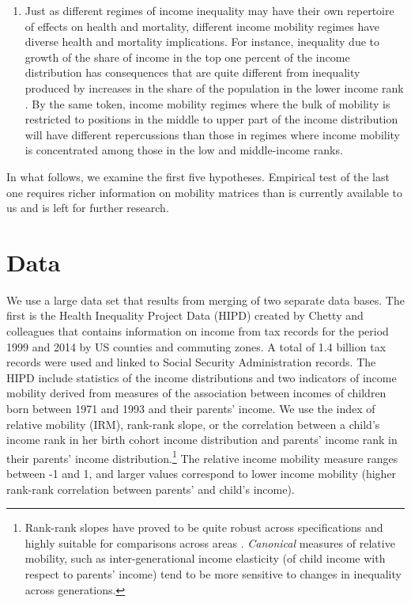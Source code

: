 \documentclass[11pt]{article}
\begin{document}
\begin{enumerate}
    \item Just as different regimes of income inequality may have their own repertoire of effects on health and mortality, different income mobility regimes have diverse health and mortality implications. For instance, inequality due to growth of the share of income in the top one percent of the income distribution has consequences that are quite different from inequality produced by increases in the share of the population in the lower income rank \citep{Piketty2003}. By the same token, income mobility regimes where the bulk of mobility is restricted to positions in the middle to upper part of the income distribution will have different repercussions than those in regimes where income mobility is concentrated among those in the low and middle-income ranks. 
    
    
\end{enumerate}

In what follows, we examine the first five hypotheses. Empirical test of the last one requires richer information on mobility matrices than is currently available to us and is left for further research. 

\section{Data}

We use a large data set that results from merging of two separate data bases. The first is the Health Inequality Project Data (HIPD) created by Chetty and colleagues \citep{Chetty2016} that contains information on income from tax records for the period 1999 and 2014 by US counties and commuting zones. A total of 1.4 billion tax records were used and linked to Social Security Administration records. The HIPD include statistics of the income distributions and two indicators of income mobility derived from measures of the association between incomes of children born between 1971 and 1993 and their parents' income. We use the index of relative mobility (IRM), rank-rank slope, or the correlation between a child's income rank in her birth cohort income distribution and parents' income rank in their parents' income distribution.\footnote{Rank-rank slopes have proved to be quite robust across specifications and highly suitable for comparisons across areas \citep{Chetty2014}. \textit{Canonical} measures of relative mobility, such as inter-generational income elasticity (of child income with respect to parents' income) tend to be more sensitive to changes in inequality across generations.} The relative income mobility measure ranges between -1 and 1, and larger values correspond to lower income mobility (higher rank-rank correlation between parents' and child's income).  
\end{document}
